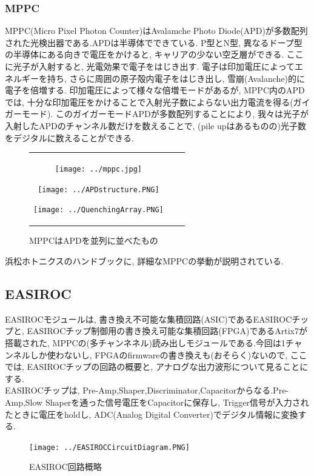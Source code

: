 \subsubsection{MPPC}
MPPC(Micro Pixel Photon Counter)はAvalamche Photo Diode(APD)が多数配列された光検出器である.APDは半導体でできている.
P型とN型, 異なるドープ型の半導体にある向きで電圧をかけると, キャリアの少ない空乏層ができる.
ここに光子が入射すると, 光電効果で電子をはじき出す.
電子は印加電圧によってエネルギーを持ち, さらに周囲の原子殻内電子をはじき出し, 雪崩(Avalanche)的に電子を倍増する.
印加電圧によって様々な倍増モードがあるが, MPPC内のAPDでは, 十分な印加電圧をかけることで入射光子数によらない出力電流を得る(ガイガーモード).
このガイガーモードAPDが多数配列することにより, 我々は光子が入射したAPDのチャンネル数だけを数えることで, (pile upはあるものの)光子数をデジタルに数えることができる.
\begin{figure}[h]
  \begin{tabular}{ccc}
    \begin{minipage}[t]{0.33\hsize}
      \begin{center}
        \texttt{[image: ../mppc.jpg]}
      \end{center}
      \caption{MPPC}
    \end{minipage}
    \begin{minipage}[t]{0.33\hsize}
      \begin{center}
        \texttt{[image: ../APDstructure.PNG]}
      \end{center}
      \caption{APD}
    \end{minipage}
    \begin{minipage}[t]{0.33\hsize}
      \begin{center}
        \texttt{[image: ../QuenchingArray.PNG]}
      \end{center}
      \caption{MPPCはAPDを並列に並べたもの}
    \end{minipage}
  \end{tabular}
\end{figure}

浜松ホトニクスのハンドブックに, 詳細なMPPCの挙動が説明されている.\cite{hamamatsu}

\subsection{EASIROC}
EASIROCモジュールは, 書き換え不可能な集積回路(ASIC)であるEASIROCチップと, EASIROCチップ制御用の書き換え可能な集積回路(FPGA)であるArtix7が搭載された, MPPCの(多チャンネネル)読み出しモジュールである.今回は1チャンネルしか使わないし, FPGAのfirmwareの書き換えも(おそらく)ないので, ここでは, EASIROCチップの回路の概要と, アナログな出力波形について見ることにする.\\
EASIROCチップは, Pre-Amp,Shaper,Discriminator,Capacitorからなる.Pre-Amp,Slow Shaperを通った信号電圧をCapacitorに保存し, Trigger信号が入力されたときに電圧をholdし, ADC(Analog Digital Converter)でデジタル情報に変換する.
\begin{figure}[H]
  \begin{center}
    \texttt{[image: ../EASIROCCircuitDiagram.PNG]}
  \end{center}
  \caption{EASIROC回路概略}
\end{figure}

